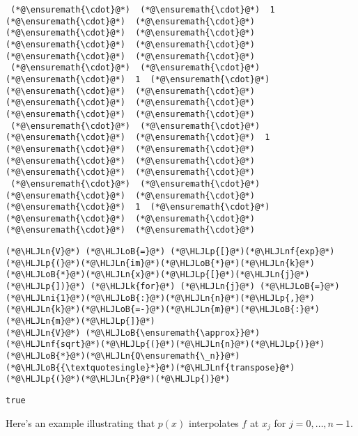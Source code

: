 \documentclass[12pt,landscape]{article}
\newcommand{\HLJLk}[1]{\textcolor[RGB]{148,91,176}{\textbf{#1}}}
\newcommand{\HLJLn}[1]{#1}
\newcommand{\HLJLnf}[1]{\textcolor[RGB]{66,102,213}{#1}}
\newcommand{\HLJLni}[1]{\textcolor[RGB]{59,151,46}{#1}}
\newcommand{\HLJLoB}[1]{\textcolor[RGB]{102,102,102}{\textbf{#1}}}
\newcommand{\HLJLp}[1]{#1}
\begin{document}
{\begin{lstlisting}
 (*@\ensuremath{\cdot}@*)  (*@\ensuremath{\cdot}@*)  1  (*@\ensuremath{\cdot}@*)  (*@\ensuremath{\cdot}@*)  (*@\ensuremath{\cdot}@*)  (*@\ensuremath{\cdot}@*)  (*@\ensuremath{\cdot}@*)  (*@\ensuremath{\cdot}@*)  (*@\ensuremath{\cdot}@*)  (*@\ensuremath{\cdot}@*)
 (*@\ensuremath{\cdot}@*)  (*@\ensuremath{\cdot}@*)  (*@\ensuremath{\cdot}@*)  1  (*@\ensuremath{\cdot}@*)  (*@\ensuremath{\cdot}@*)  (*@\ensuremath{\cdot}@*)  (*@\ensuremath{\cdot}@*)  (*@\ensuremath{\cdot}@*)  (*@\ensuremath{\cdot}@*)  (*@\ensuremath{\cdot}@*)
 (*@\ensuremath{\cdot}@*)  (*@\ensuremath{\cdot}@*)  (*@\ensuremath{\cdot}@*)  (*@\ensuremath{\cdot}@*)  1  (*@\ensuremath{\cdot}@*)  (*@\ensuremath{\cdot}@*)  (*@\ensuremath{\cdot}@*)  (*@\ensuremath{\cdot}@*)  (*@\ensuremath{\cdot}@*)  (*@\ensuremath{\cdot}@*)
 (*@\ensuremath{\cdot}@*)  (*@\ensuremath{\cdot}@*)  (*@\ensuremath{\cdot}@*)  (*@\ensuremath{\cdot}@*)  (*@\ensuremath{\cdot}@*)  1  (*@\ensuremath{\cdot}@*)  (*@\ensuremath{\cdot}@*)  (*@\ensuremath{\cdot}@*)  (*@\ensuremath{\cdot}@*)  (*@\ensuremath{\cdot}@*)
\end{lstlisting}


\begin{lstlisting}
(*@\HLJLn{V}@*) (*@\HLJLoB{=}@*) (*@\HLJLp{[}@*)(*@\HLJLnf{exp}@*)(*@\HLJLp{(}@*)(*@\HLJLn{im}@*)(*@\HLJLoB{*}@*)(*@\HLJLn{k}@*)(*@\HLJLoB{*}@*)(*@\HLJLn{x}@*)(*@\HLJLp{[}@*)(*@\HLJLn{j}@*)(*@\HLJLp{])}@*) (*@\HLJLk{for}@*) (*@\HLJLn{j}@*) (*@\HLJLoB{=}@*) (*@\HLJLni{1}@*)(*@\HLJLoB{:}@*)(*@\HLJLn{n}@*)(*@\HLJLp{,}@*) (*@\HLJLn{k}@*)(*@\HLJLoB{=-}@*)(*@\HLJLn{m}@*)(*@\HLJLoB{:}@*)(*@\HLJLn{m}@*)(*@\HLJLp{]}@*)
(*@\HLJLn{V}@*) (*@\HLJLoB{\ensuremath{\approx}}@*) (*@\HLJLnf{sqrt}@*)(*@\HLJLp{(}@*)(*@\HLJLn{n}@*)(*@\HLJLp{)}@*)(*@\HLJLoB{*}@*)(*@\HLJLn{Q\ensuremath{\_n}}@*)(*@\HLJLoB{{\textquotesingle}*}@*)(*@\HLJLnf{transpose}@*)(*@\HLJLp{(}@*)(*@\HLJLn{P}@*)(*@\HLJLp{)}@*)
\end{lstlisting}

\begin{lstlisting}
true
\end{lstlisting}


Here's an example illustrating that $p(x)$ interpolates $f$ at $x_{j}$ for $j = 0, \ldots, n-1$.


}
\end{document}
